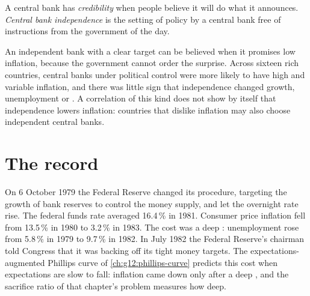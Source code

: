 \begin{definition}\label{def:g12:monetary-policy:credibility}
A central bank has \emph{credibility} when people believe it will do what it announces. \emph{Central bank independence}%
\label{def:g12:monetary-policy:independence} is the setting of policy by a central bank free of instructions from the government of the day.
\end{definition}

An independent bank with a clear target can be believed when it promises low inflation, because the government cannot order the surprise. Across sixteen rich countries,
central banks under political control were more likely to have high and variable inflation, and there was little sign that independence changed growth, unemployment or
. A correlation of this kind does not show by itself that independence lowers inflation: countries that dislike inflation may also choose independent
central banks.

\section{The record}\label{sec:g12:monetary-policy:record}

\begin{record}[The disinflation of 1979--83]
On 6 October 1979 the Federal Reserve changed its procedure, targeting the growth of bank reserves to control the money supply, and let the overnight rate rise. The
federal funds rate averaged 16.4\,\% in 1981. Consumer price inflation fell from 13.5\,\% in 1980 to 3.2\,\% in 1983. The cost was a deep : unemployment rose from
5.8\,\% in 1979 to 9.7\,\% in 1982. In July 1982 the Federal Reserve's chairman told Congress that it was backing off its tight money targets. The expectations-augmented Phillips
curve of \cref{ch:g12:phillips-curve} predicts this cost when expectations are slow to fall: inflation came down only after a deep , and the
sacrifice ratio of that chapter's problem measures how deep.
\end{record}

